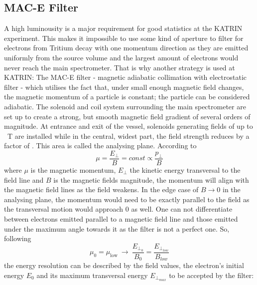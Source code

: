       \begin{figure}
      	
      \end{figure}


      \subsection{MAC-E Filter}
      \label{ch:The KATRIN experiment:sec:MAC-E}
      A high luminousity is a major requirement for good statistics at the KATRIN experiment. This makes it impossible to use some kind of aperture to filter for electrons from Tritium decay with one momentum direction as they are emitted uniformly from the source volume and the largest amount of electrons would never reach the main spectrometer. That is why another strategy is used at KATRIN: The MAC-E filter - magnetic adiabatic collimation with electrostatic filter - which utilises the fact that, under small enough magnetic field changes, the magnetic momentum of a particle is constant; the particle can be considered adiabatic. The solenoid and coil system surrounding the main spectrometer are set up to create a strong, but smooth magnetic field gradient of several orders of magnitude. At entrance and exit of the vessel, solenoids generating fields of up to \SI{}{\tesla} are installed while in the central, widest part, the field strength reduces by a factor of . This area is called the analysing plane. According to
      \begin{equation}
      	\mu = \frac{E_{\bot}}{B} = const \propto \frac{p_\bot}{B}
      \end{equation}
      where $\mu$ is the magnetic momentum, $E_\bot$ the kinetic energy transversal to the field line and $B$ is the magnetic fields magnitude, the momentum will align with the magnetic field lines as the field weakens. In the edge case of $B\rightarrow 0$ in the analysing plane, the momentum would need to be exactly parallel to the field as the transversal motion would approach 0 as well. 
      One can not differentiate between electrons emitted parallel to a magnetic field line and those emitted under the maximum angle towards it as the filter is not a perfect one. So, following
      \begin{equation}
      	\mu_{\mathrm{0}} = \mu_{\mathrm{low}} ~ \longrightarrow ~ \frac{E_{\bot_0}}{B_0} = \frac{E_{\bot_{low}}}{B_{low}} 
      \end{equation}
      the energy resolution can be described by the field values, the electron's initial energy $E_0$ and its maximum transversal energy $E_{\bot_{max}}$ to be accepted by the filter:
